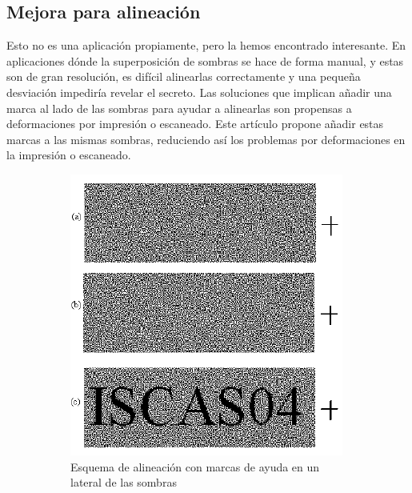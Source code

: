 \newpage
\subsection{Mejora para alineación}
Esto no es una aplicación propiamente, pero la hemos encontrado interesante. En
aplicaciones dónde la superposición de sombras se hace de forma manual, y estas
son de gran resolución, es difícil alinearlas correctamente y una pequeña
desviación impediría revelar el secreto. Las soluciones que implican añadir una
marca al lado de las sombras para ayudar a alinearlas son propensas a
deformaciones por impresión o escaneado. Este artículo \cite{aplicaciones_print}
propone añadir estas marcas a las mismas sombras, reduciendo así los problemas
por deformaciones en la impresión o escaneado.

\begin{figure}[ht]
	\centering
	\begin{subfigure}[t]{0.4\textwidth}
		\centering
		\includegraphics[width=\textwidth]{images/alin1}
		\caption{Esquema de alineación con marcas de ayuda en un lateral
		de las sombras}
		\label{fig:alin1}
	\end{subfigure}
	\hspace{0.5cm}
	\begin{subfigure}[t]{0.4\textwidth}
		\centering

\end{subfigure}
\end{figure}
